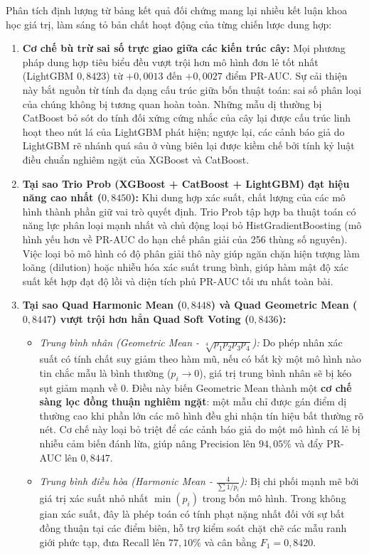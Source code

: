 
Phân tích định lượng từ bảng kết quả đối chứng mang lại nhiều kết luận khoa học giá trị, làm sáng tỏ bản chất hoạt động của từng chiến lược dung hợp:
\begin{enumerate}
    \item \textbf{Cơ chế bù trừ sai số trực giao giữa các kiến trúc cây:} Mọi phương pháp dung hợp tiêu biểu đều vượt trội hơn mô hình đơn lẻ tốt nhất (LightGBM $0{,}8423$) từ $+0{,}0013$ đến $+0{,}0027$ điểm PR-AUC. Sự cải thiện này bắt nguồn từ tính đa dạng cấu trúc giữa bốn thuật toán: sai số phân loại của chúng không bị tương quan hoàn toàn. Những mẫu dị thường bị CatBoost bỏ sót do tính đối xứng cứng nhắc của cây lại được cấu trúc linh hoạt theo nút lá của LightGBM phát hiện; ngược lại, các cảnh báo giả do LightGBM rẽ nhánh quá sâu ở vùng biên lại được kiềm chế bởi tính kỷ luật điều chuẩn nghiêm ngặt của XGBoost và CatBoost.
    \item \textbf{Tại sao Trio Prob (XGBoost + CatBoost + LightGBM) đạt hiệu năng cao nhất ($0{,}8450$):} Khi dung hợp xác suất, chất lượng của các mô hình thành phần giữ vai trò quyết định. Trio Prob tập hợp ba thuật toán có năng lực phân loại mạnh nhất và chủ động loại bỏ HistGradientBoosting (mô hình yếu hơn về PR-AUC do hạn chế phân giải của 256 thùng số nguyên). Việc loại bỏ mô hình có độ phân giải thô này giúp ngăn chặn hiện tượng làm loãng (dilution) hoặc nhiễu hóa xác suất trung bình, giúp hàm mật độ xác suất kết hợp đạt độ lồi và diện tích phủ PR-AUC tối ưu nhất toàn bài.
    \item \textbf{Tại sao Quad Harmonic Mean ($0{,}8448$) và Quad Geometric Mean ($0{,}8447$) vượt trội hơn hẳn Quad Soft Voting ($0{,}8436$):} 
    \begin{itemize}
        \item \textit{Trung bình nhân (Geometric Mean - $\sqrt[4]{p_1 p_2 p_3 p_4}$):} Do phép nhân xác suất có tính chất suy giảm theo hàm mũ, nếu có bất kỳ một mô hình nào tin chắc mẫu là bình thường ($p_i \to 0$), giá trị trung bình nhân sẽ bị kéo sụt giảm mạnh về 0. Điều này biến Geometric Mean thành một \textbf{cơ chế sàng lọc đồng thuận nghiêm ngặt}: một mẫu chỉ được gán điểm dị thường cao khi phần lớn các mô hình đều ghi nhận tín hiệu bất thường rõ nét. Cơ chế này loại bỏ triệt để các cảnh báo giả do một mô hình cá lẻ bị nhiễu cảm biến đánh lừa, giúp nâng Precision lên $94{,}05\%$ và đẩy PR-AUC lên $0{,}8447$.
        \item \textit{Trung bình điều hòa (Harmonic Mean - $\frac{4}{\sum 1/p_i}$):} Bị chi phối mạnh mẽ bởi giá trị xác suất nhỏ nhất $\min(p_i)$ trong bốn mô hình. Trong không gian xác suất, đây là phép toán có tính phạt nặng nhất đối với sự bất đồng thuận tại các điểm biên, hỗ trợ kiểm soát chặt chẽ các mẫu ranh giới phức tạp, đưa Recall lên $77{,}10\%$ và cân bằng $F_1 = 0{,}8420$.

\end{itemize}
\end{enumerate}
